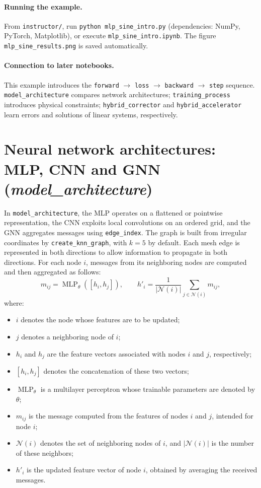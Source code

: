 \documentclass[11pt,a4paper]{article}
\begin{document}
\paragraph{Running the example.} From \texttt{instructor/}, run \texttt{python mlp\_sine\_intro.py} (dependencies: NumPy, PyTorch, Matplotlib), or execute \texttt{mlp\_sine\_intro.ipynb}. The figure \texttt{mlp\_sine\_results.png} is saved automatically.
\paragraph{Connection to later notebooks.} This example introduces the \texttt{forward} $\rightarrow$ \texttt{loss} $\rightarrow$ \texttt{backward} $\rightarrow$ \texttt{step} sequence. \texttt{model\_architecture} compares network architectures; \texttt{training\_process} introduces physical constraints; \texttt{hybrid\_corrector} and \texttt{hybrid\_accelerator} learn errors and solutions of linear systems, respectively.

\section{Neural network architectures: MLP, CNN and GNN (\textit{model\_architecture})}

In \texttt{model\_architecture}, the MLP operates on a flattened
or pointwise representation, the CNN exploits local convolutions
on an ordered grid, and the GNN aggregates messages using
\texttt{edge\_index}.
The graph is built from irregular coordinates by
\texttt{create\_knn\_graph}, with $k=5$ by default.
Each mesh edge is represented in both directions to allow
information to propagate in both directions.
For each node $i$, messages from its neighboring nodes are
computed and then aggregated as follows:
\[
m_{ij} = \operatorname{MLP}_{\theta}([h_i,h_j]),
\qquad
h'_i = \frac{1}{|\mathcal{N}(i)|}
\sum_{j \in \mathcal{N}(i)} m_{ij},
\]
where:
\begin{itemize}
    \item $i$ denotes the node whose features are to be updated;
    \item $j$ denotes a neighboring node of $i$;
    \item $h_i$ and $h_j$ are the feature vectors associated
    with nodes $i$ and $j$, respectively;
    \item $[h_i,h_j]$ denotes the concatenation of these
    two vectors;
    \item $\operatorname{MLP}_{\theta}$ is a multilayer
    perceptron whose trainable parameters are denoted by
    $\theta$;
    \item $m_{ij}$ is the message computed from the features
    of nodes $i$ and $j$, intended for node $i$;
    \item $\mathcal{N}(i)$ denotes the set of neighboring
    nodes of $i$, and $|\mathcal{N}(i)|$ is the number
    of these neighbors;
    \item $h'_i$ is the updated feature vector of node $i$,
    obtained by averaging the received messages.
\end{itemize}
\end{document}
